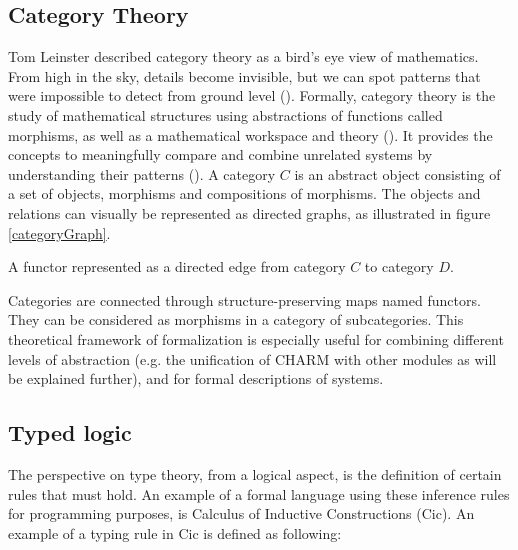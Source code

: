 \begin{figure}[h]
\centering

\label{category} 
\end{figure}


\subsection{Category Theory}
Tom Leinster described category theory as a bird's eye view of mathematics. From high in the sky, details become invisible, but we can spot patterns that were impossible to detect from ground level (\cite{leinster_basic_2016}). Formally, category theory is the study of mathematical structures using abstractions of functions called morphisms, as well as a mathematical workspace and theory (\cite{barr_category_2012, eades_type_2012}). It provides the concepts to meaningfully compare and combine unrelated systems by understanding their patterns (\cite{harley_abstract_2020}). 
A category $C$ is an abstract object consisting of a set of objects, morphisms and compositions of morphisms. The objects and relations can visually be represented as directed graphs, as illustrated in figure \ref{categoryGraph}.

\begin{marginfigure}
    \centering
    \vspace{2cm}
    
    \vspace{0.2cm}
    \caption{A functor represented as a directed edge from category $C$ to category $D$.}
    \label{functor}
\end{marginfigure}

 Categories are connected through structure-preserving maps named functors. They can be considered as morphisms in a category of subcategories.
 This theoretical framework of formalization is especially useful for combining different levels of abstraction (e.g. the unification of CHARM with other modules as will be explained further), and for formal descriptions of systems.

\subsection{Typed logic}
\label{sec:cic}
The perspective on type theory, from a logical aspect, is the definition of certain rules that must hold. An example of a formal language using these inference rules for programming purposes, is Calculus of Inductive Constructions (Cic). An example of a typing rule in Cic is defined as following: 

